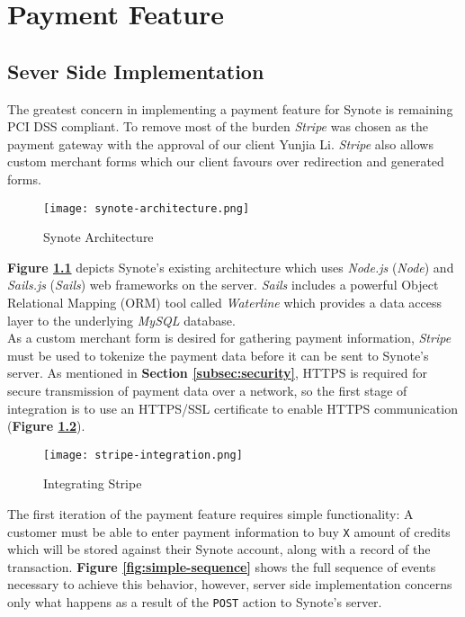\chapter{Payment Feature}
\label{chap:payment-feature}


\section{Sever Side Implementation}
\label{sec:server-side-implementation}

The greatest concern in implementing a payment feature for Synote is remaining PCI DSS compliant. To remove most of the burden \textit{Stripe} was chosen as the payment gateway with the approval of our client Yunjia Li. \textit{Stripe} also allows custom merchant forms which our client favours over redirection and generated forms.\\

\begin{figure}[!hbt]
  \centering
 	\texttt{[image: synote-architecture.png]}
  \caption{Synote Architecture}
 	\label{fig:synote-architecture}
\end{figure}

\textbf{Figure \ref{fig:synote-architecture}} depicts Synote's existing architecture which uses \textit{Node.js} (\textit{Node}) and \textit{Sails.js} (\textit{Sails}) web frameworks on the server. \textit{Sails} includes a powerful Object Relational Mapping (ORM) tool called \textit{Waterline} which provides a data access layer to the underlying \textit{MySQL} database.\\

As a custom merchant form is desired for gathering payment information, \textit{Stripe} must be used to tokenize the payment data before it can be sent to Synote's server. As mentioned in \textbf{Section \ref{subsec:security}}, HTTPS is required for secure transmission of payment data over a network, so the first stage of integration is to use an HTTPS/SSL certificate to enable HTTPS communication (\textbf{Figure \ref{fig:stripe-integration}}).\\

\begin{figure}[!hbt]
  \centering
 	\texttt{[image: stripe-integration.png]}
  \caption{Integrating Stripe}
 	\label{fig:stripe-integration}
\end{figure}

The first iteration of the payment feature requires simple functionality: A customer must be able to enter payment information to buy \texttt{X} amount of credits which will be stored against their Synote account, along with a record of the transaction. \textbf{Figure \ref{fig:simple-sequence}} shows the full sequence of events necessary to achieve this behavior, however, server side implementation concerns only what happens as a result of the \texttt{POST} action to Synote's server.\\

